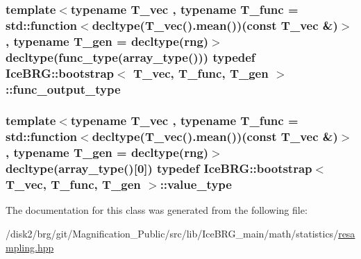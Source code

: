 \subsubsection[{func\+\_\+output\+\_\+type}]{\setlength{\rightskip}{0pt plus 5cm}template$<$typename T\+\_\+vec , typename T\+\_\+func  = std\+::function$<$decltype(\+T\+\_\+vec().\+mean())(const T\+\_\+vec \&)$>$, typename T\+\_\+gen  = decltype(rng)$>$ decltype({\bf func\+\_\+type}({\bf array\+\_\+type}())) typedef {\bf Ice\+B\+R\+G\+::bootstrap}$<$ T\+\_\+vec, T\+\_\+func, T\+\_\+gen $>$\+::func\+\_\+output\+\_\+type}\label{classIceBRG_1_1bootstrap_a1639d76d292b98b3e4369a944d7bc13b}
\hypertarget{classIceBRG_1_1bootstrap_a484f51dd78ae0dffeb18ef22bfdc4c6f}{}
\subsubsection[{value\+\_\+type}]{\setlength{\rightskip}{0pt plus 5cm}template$<$typename T\+\_\+vec , typename T\+\_\+func  = std\+::function$<$decltype(\+T\+\_\+vec().\+mean())(const T\+\_\+vec \&)$>$, typename T\+\_\+gen  = decltype(rng)$>$ decltype({\bf array\+\_\+type}()\mbox{[}0\mbox{]}) typedef {\bf Ice\+B\+R\+G\+::bootstrap}$<$ T\+\_\+vec, T\+\_\+func, T\+\_\+gen $>$\+::value\+\_\+type}\label{classIceBRG_1_1bootstrap_a484f51dd78ae0dffeb18ef22bfdc4c6f}


The documentation for this class was generated from the following file\+:\begin{DoxyCompactItemize}
\item 
/disk2/brg/git/\+Magnification\+\_\+\+Public/src/lib/\+Ice\+B\+R\+G\+\_\+main/math/statistics/\hyperlink{resampling_8hpp}{resampling.\+hpp}\end{DoxyCompactItemize}
